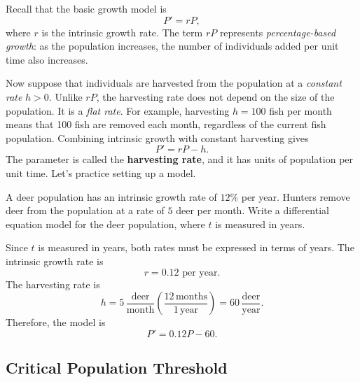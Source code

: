 \documentclass[10pt,letterpaper]{article}
\begin{document}
Recall that the basic growth model is
\[
P'=rP,
\]
where $r$ is the intrinsic growth rate. The term $rP$ represents
\textit{percentage-based growth}: as the population increases, the number of
individuals added per unit time also increases.

Now suppose that individuals are harvested from the population at a \textit{constant
rate} $h>0$. Unlike $rP$, the harvesting rate does not depend on the size of
the population. It is a \textit{flat rate}. For example, harvesting
$h=100$ fish per month means that 100 fish are removed each month, regardless
of the current fish population. Combining intrinsic growth with constant harvesting gives
\[
P'=rP-h.
\]
The parameter is called the \textbf{harvesting rate}, and it has units of population per unit time. Let's practice setting up a model. 

\begin{example}[3]{
A deer population has an intrinsic growth rate of $12\%$ per year.
Hunters remove deer from the population at a rate of $5$ deer per month.
Write a differential equation model for the deer population, where $t$ is
measured in years.
}

Since $t$ is measured in years, both rates must be expressed in terms of
years. The intrinsic growth rate is
\[
r=0.12 \text{ per year}.
\]
The harvesting rate is
\[
h
=
5\,\frac{\text{deer}}{\text{month}}
\left(
\frac{12\,\text{months}}{1\,\text{year}}
\right)
=
60\,\frac{\text{deer}}{\text{year}}.
\]
Therefore, the model is
\[
\boxed{
P'=0.12P-60.
}
\]
\end{example}

\subsection{Critical Population Threshold}
\end{document}
